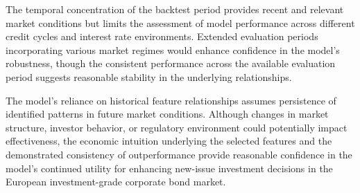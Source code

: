 The temporal concentration of the backtest period provides recent and relevant market conditions but limits the assessment of model performance across different credit cycles and interest rate environments. Extended evaluation periods incorporating various market regimes would enhance confidence in the model's robustness, though the consistent performance across the available evaluation period suggests reasonable stability in the underlying relationships.

The model's reliance on historical feature relationships assumes persistence of identified patterns in future market conditions. Although changes in market structure, investor behavior, or regulatory environment could potentially impact effectiveness, the economic intuition underlying the selected features and the demonstrated consistency of outperformance provide reasonable confidence in the model's continued utility for enhancing new-issue investment decisions in the European investment-grade corporate bond market.